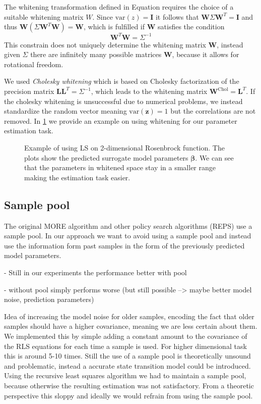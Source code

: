 The whitening transformation defined in Equation  requires
the choice of a suitable whitening matrix $W$.
Since $\text{var}(z) = \mathbf{I}$ it follows that
$\mathbf{W}\Sigma \mathbf{W}^T = \mathbf{I}$ and thus
$\mathbf{W}(\Sigma \mathbf{W}^T\mathbf{W}) = \mathbf{W}$, which
is fulfilled if $\mathbf{W}$ satisfies the condition
$$ \mathbf{W}^T \mathbf{W} = \Sigma^{-1} $$
This constrain does not uniquely determine the whitening
matrix $\mathbf{W}$, instead given $\Sigma$ there are infinitely many
possible matrices $\mathbf{W}$, because it allows for rotational freedom.

We used \textit{Cholesky whitening} which is based on
Cholesky factorization of the precision matrix
$\mathbf{L}\mathbf{L}^T = \Sigma^{-1}$, which leads to the whitening
matrix $\mathbf{W}^{\text{Chol}} = \mathbf{L}^T$.
If the cholesky whitening is unsuccessful due to numerical problems,
we instead standardize
the random vector meaning $\text{var}(\mathbf{z}) = 1$ but the correlations
are not removed. In \cref{fig:whitening} we provide an example on using
whitening for our parameter estimation task.

\begin{figure}[t]
  \centering
  \caption{Example of using LS on 2-dimensional
   Rosenbrock function. The plots show the predicted surrogate model
   parameters $\mathbf{\beta}$. We can see that
   the parameters in whitened space stay in a smaller range 
   making the estimation task easier.}
 \label{fig:whitening}
\end{figure}
  
\subsection{Sample pool}
The original MORE algorithm and other policy search algorithms (REPS)
use a sample pool.
In our approach  we want to avoid using a sample pool and instead use
the information form past samples in the form of the previously predicted
model parameters.

- Still in our experiments the performance better with pool

- without pool simply performs worse (but still possible --> maybe
better model noise, prediction parameters)


Idea of increasing the model noise for older samples, encoding the fact that
older samples should have a higher covariance, meaning we are less
certain about them. We implemented this by simple adding a constant
amount to the covariance of the RLS equations for each time a sample is
used. For higher dimensional task this is around 5-10 times.
Still the use of a sample pool is theoretically unsound and problematic,
instead a accurate state transition model could be introduced.
Using the recursive least squares algorithm we had to maintain a sample
pool, because otherwise the resulting estimation was not
satisfactory. From a theoretic perspective this sloppy and ideally we
would refrain from using the sample pool.

